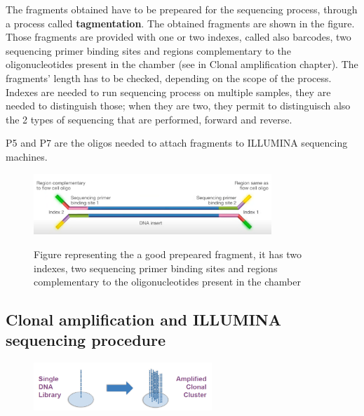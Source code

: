
The fragments obtained have to be prepeared for the sequencing process, through a process called \textbf{tagmentation}. The obtained fragments are shown in the figure. Those fragments are provided with one or two indexes, called also barcodes, two sequencing primer binding sites and regions complementary to the oligonucleotides present in the chamber (see in Clonal amplification chapter). The fragments' length has to be checked, depending on the scope of the process. Indexes are needed to run sequencing process on multiple samples, they are needed to distinguish those; when they are two, they permit to distinguisch also the 2 types of sequencing that are performed, forward and reverse.

P5 and P7 are the oligos needed to attach fragments to ILLUMINA sequencing machines.

\begin{figure}[h]
\caption{Figure representing the a good prepeared fragment, it has two indexes, two sequencing primer binding sites and regions complementary to the oligonucleotides present in the chamber}
\centering
\includegraphics[width=0.8\textwidth]{tagmentedFragments}
\label{}
\end{figure}


\subsection{Clonal amplification and ILLUMINA sequencing procedure}

\begin{figure}[h]
\caption{}
\centering
\includegraphics[width=0.6\textwidth]{clusterAmplification}
\label{clusters}
\end{figure}

